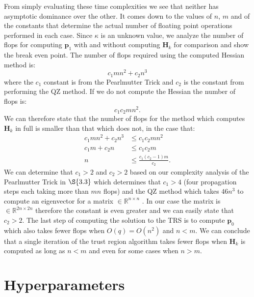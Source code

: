 \documentclass[letterpaper,12pt,titlepage,oneside,final]{book}
\begin{document}
	From simply evaluating these time complexities we see that neither has asymptotic dominance over the other. It comes down to the values of $n$, $m$ and of the constants that determine the actual number of floating point operations performed in each case. Since $\kappa$ is an unknown value, we analyze the number of flops for computing $\mathbf{p}_{1}$ with and without computing $\mathbf{H}_{k}$ for comparison and show the break even point. The number of flops required using the computed Hessian method is:
	\begin{equation}
	c_{1}mn^{2} + c_{2}n^{3}
	\end{equation}
	where the $c_{1}$ constant is from the Pearlmutter Trick and $c_{2}$ is the constant from performing the QZ method. If we do not compute the Hessian the number of flops is:
	\begin{equation}
	c_{1}c_{2}mn^{2}.
	\end{equation}
	We can therefore state that the number of flops for the method which computes $\mathbf{H}_{k}$ in full is smaller than that which does not, in the case that:
	\begin{align}
	c_{1}mn^{2} + c_{2}n^{3}  & \leq c_{1}c_{2}mn^{2} \\
	c_{1}m + c_{2}n & \leq c_{1}c_{2}m \\
	n & \leq \frac{c_{1}(c_{2}-1)m}{c_{2}}.
	\end{align}
	We can determine that $c_{1} > 2$ and $c_{2} > 2$ based on our complexity analysis of the Pearlmutter Trick in $\S{3.3}$ which determines that $c_{1} > 4$ (four propagation steps each taking more than $mn$ flops) and the QZ method which takes $46n^{3}$ to compute an eigenvector for a matrix $\in \mathbb{R}^{n \times n}$ \cite{golub1989matrix}. In our case the matrix is $\in \mathbb{R}^{2n \times 2n}$ therefore the constant is even greater and we can easily state that $c_{2} > 2$.  The last step of computing the solution to the TRS is to compute $\mathbf{p}_{0}$ which also takes fewer flops when $O(q) = O(n^{2})$ and $n < m$. We can conclude that a single iteration of the trust region algorithm takes fewer flops when $\mathbf{H}_{k}$ is computed as long as $n < m$ and even for some cases when $n > m$. 
	
	\chapter{Hyperparameters}
	
\end{document}
